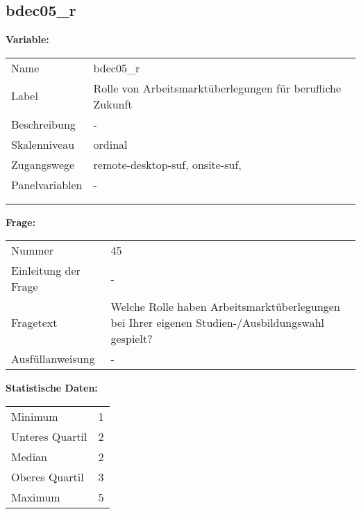 	
	
	\subsection{bdec05\_r}
	\label{subSection:bdec05_r}

	\noindent\textbf{Variable:}\\
		\begin{tabular}{lL{11.3cm}}
			\label{tableVariable:bdec05_r}
			Name & bdec05\_r \\
			Label & Rolle von Arbeitsmarktüberlegungen für berufliche Zukunft \\
			Beschreibung & - \\
			Skalenniveau & ordinal \\
			Zugangswege &
				remote-desktop-suf,
				onsite-suf,
 \\
			Panelvariablen & -
			 \\
			 \\
 \\
		\end{tabular}

		\vspace*{1 cm}
		\noindent\textbf{Frage:}\\
		\begin{tabular}{lL{11.3cm}}
			\label{tableQuestion:bdec05_r}
			Nummer & 45 \\
			Einleitung der Frage & - \\
			Fragetext & Welche Rolle haben Arbeitsmarktüberlegungen bei Ihrer eigenen Studien-/Ausbildungswahl gespielt? \\
			Ausfüllanweisung & - \\
		\end{tabular}


		\vspace*{1 cm}
		\noindent\textbf{Statistische Daten:}\\
			\begin{tabular}{ll}
				\label{tableStatistics:bdec05_r}
					Minimum & 1 \\
					Unteres Quartil & 2 \\
					Median & 2 \\
					Oberes Quartil & 3 \\
					Maximum & 5 \\
			\end{tabular}



